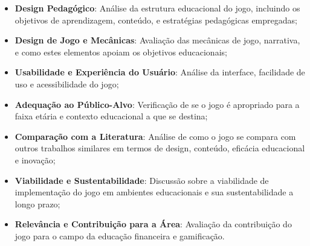 \begin{itemize}
	\item \textbf{Design Pedagógico}: Análise da estrutura educacional do jogo, incluindo os objetivos de aprendizagem, conteúdo, e estratégias pedagógicas empregadas;
	\item \textbf{Design de Jogo e Mecânicas}: Avaliação das mecânicas de jogo, narrativa, e como estes elementos apoiam os objetivos educacionais;
	\item \textbf{Usabilidade e Experiência do Usuário}: Análise da interface, facilidade de uso e acessibilidade do jogo;
	\item \textbf{Adequação ao Público-Alvo}: Verificação de se o jogo é apropriado para a faixa etária e contexto educacional a que se destina;
	\item \textbf{Comparação com a Literatura}: Análise de como o jogo se compara com outros trabalhos similares em termos de design, conteúdo, eficácia educacional e inovação;
	\item \textbf{Viabilidade e Sustentabilidade}: Discussão sobre a viabilidade de implementação do jogo em ambientes educacionais e sua sustentabilidade a longo prazo;
	\item \textbf{Relevância e Contribuição para a Área}: Avaliação da contribuição do jogo para o campo da educação financeira e gamificação.
\end{itemize}
